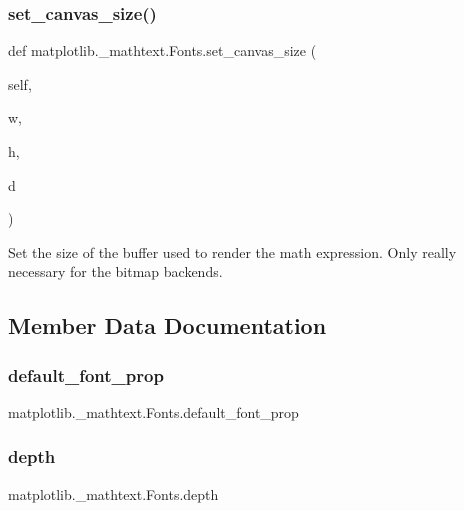 \subsubsection{\texorpdfstring{set\+\_\+canvas\+\_\+size()}{set\_canvas\_size()}}
{\footnotesize\ttfamily def matplotlib.\+\_\+mathtext.\+Fonts.\+set\+\_\+canvas\+\_\+size (\begin{DoxyParamCaption}\item[{}]{self,  }\item[{}]{w,  }\item[{}]{h,  }\item[{}]{d }\end{DoxyParamCaption})}

\begin{DoxyVerb}Set the size of the buffer used to render the math expression.
Only really necessary for the bitmap backends.
\end{DoxyVerb}
 

\subsection{Member Data Documentation}
\mbox{\label{classmatplotlib_1_1__mathtext_1_1Fonts_a716114e691f32387590085aa0f7128ce}} 
\subsubsection{\texorpdfstring{default\+\_\+font\+\_\+prop}{default\_font\_prop}}
{\footnotesize\ttfamily matplotlib.\+\_\+mathtext.\+Fonts.\+default\+\_\+font\+\_\+prop}

\mbox{\label{classmatplotlib_1_1__mathtext_1_1Fonts_a297c8b5ab1db0a3c9707a866561b344d}} 
\subsubsection{\texorpdfstring{depth}{depth}}
{\footnotesize\ttfamily matplotlib.\+\_\+mathtext.\+Fonts.\+depth}

